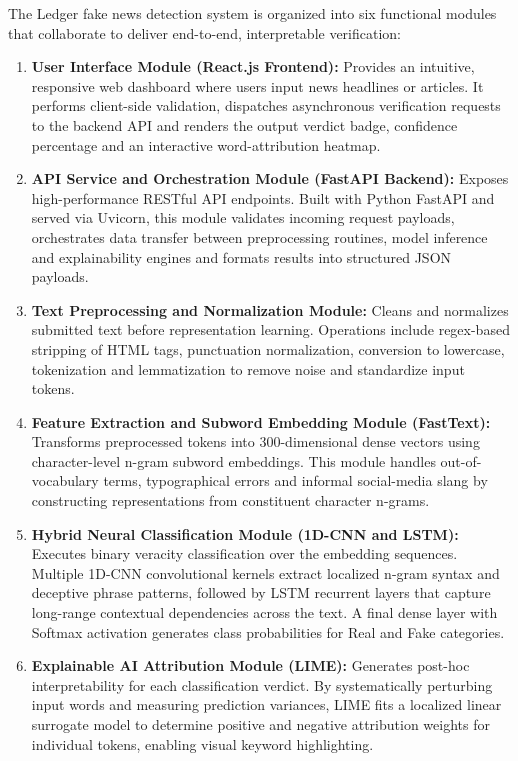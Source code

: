 \documentclass[12pt,a4paper,oneside]{report}
\begin{document}
The Ledger fake news detection system is organized into six functional modules that
collaborate to deliver end-to-end, interpretable verification:

\begin{enumerate}[label=\arabic*., leftmargin=*, itemsep=4pt]
  \item \textbf{User Interface Module (React.js Frontend):}
        Provides an intuitive, responsive web dashboard where users input news headlines or
        articles. It performs client-side validation, dispatches asynchronous verification
        requests to the backend API and renders the output verdict badge, confidence percentage
        and an interactive word-attribution heatmap.

  \item \textbf{API Service and Orchestration Module (FastAPI Backend):}
        Exposes high-performance RESTful API endpoints. Built with Python FastAPI and served
        via Uvicorn, this module validates incoming request payloads, orchestrates data transfer
        between preprocessing routines, model inference and explainability engines and formats
        results into structured JSON payloads.

  \item \textbf{Text Preprocessing and Normalization Module:}
        Cleans and normalizes submitted text before representation learning. Operations include
        regex-based stripping of HTML tags, punctuation normalization, conversion to lowercase,
        tokenization and lemmatization to remove noise and standardize input tokens.

  \item \textbf{Feature Extraction and Subword Embedding Module (FastText):}
        Transforms preprocessed tokens into 300-dimensional dense vectors using character-level
        n-gram subword embeddings. This module handles out-of-vocabulary terms, typographical
        errors and informal social-media slang by constructing representations from constituent
        character n-grams.

  \item \textbf{Hybrid Neural Classification Module (1D-CNN and LSTM):}
        Executes binary veracity classification over the embedding sequences. Multiple 1D-CNN
        convolutional kernels extract localized n-gram syntax and deceptive phrase patterns,
        followed by LSTM recurrent layers that capture long-range contextual dependencies across
        the text. A final dense layer with Softmax activation generates class probabilities for
        Real and Fake categories.

  \item \textbf{Explainable AI Attribution Module (LIME):}
        Generates post-hoc interpretability for each classification verdict. By systematically
        perturbing input words and measuring prediction variances, LIME fits a localized linear
        surrogate model to determine positive and negative attribution weights for individual
        tokens, enabling visual keyword highlighting.
\end{enumerate}
\end{document}
